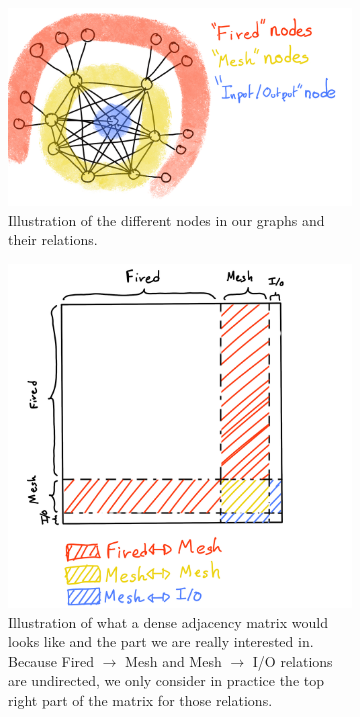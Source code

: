 \documentclass[../main.tex]{subfiles}
\begin{document}
\begin{figure}
  \centering
  \begin{subfigure}[t]{0.6\linewidth}
    \includegraphics[width=\linewidth]{images/jgnn/nodes_schema.png}
    \caption{Illustration of the different nodes in our graphs and their relations.}
    \label{fig:jgnn:node_schema}
  \end{subfigure}
  \hfill
  \begin{subfigure}[t]{0.39\linewidth}
    \includegraphics[width=\linewidth]{images/jgnn/adjacency_mat.png}
    \caption{Illustration of what a dense adjacency matrix would looks like and the part we are really interested in. Because Fired $\rightarrow$ Mesh and Mesh $\rightarrow$ I/O relations are undirected, we only consider in practice the top right part of the matrix for those relations.}
    \label{fig:jgnn:adj}
  \end{subfigure}
  \caption{}
\end{figure}
\end{document}
